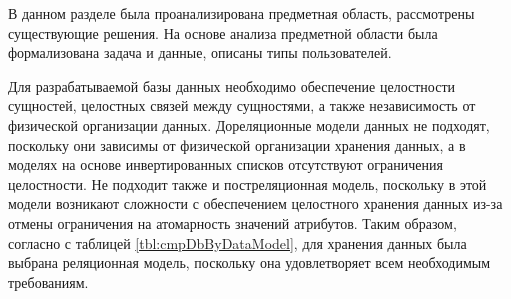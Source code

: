 В данном разделе была проанализирована предметная область, рассмотрены существующие решения. На основе анализа предметной области была формализована задача и данные, описаны типы пользователей. 

Для разрабатываемой базы данных необходимо обеспечение целостности сущностей, целостных связей между сущностями, а также независимость от физической организации данных. Дореляционные модели данных не подходят, поскольку они зависимы от физической организации хранения данных, а в моделях на основе инвертированных списков отсутствуют ограничения целостности. Не подходит также и постреляционная модель, поскольку в этой модели возникают сложности с обеспечением целостного хранения данных из-за отмены ограничения на атомарность значений атрибутов. Таким образом, согласно с таблицей \ref{tbl:cmpDbByDataModel}, для хранения данных была выбрана реляционная модель, поскольку она удовлетворяет всем необходимым требованиям.